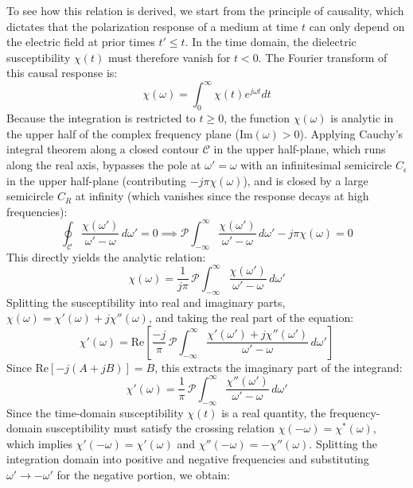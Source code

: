 To see how this relation is derived, we start from the principle of causality, which dictates that the polarization response of a medium at time $t$ can only depend on the electric field at prior times $t' \le t$. In the time domain, the dielectric susceptibility $\chi(t)$ must therefore vanish for $t < 0$. The Fourier transform of this causal response is:
\begin{equation*}
    \chi(\omega) = \int_0^\infty \chi(t) e^{j\omega t} dt
\end{equation*}
Because the integration is restricted to $t \ge 0$, the function $\chi(\omega)$ is analytic in the upper half of the complex frequency plane ($\text{Im}(\omega) > 0$). Applying Cauchy's integral theorem along a closed contour $\mathcal{C}$ in the upper half-plane, which runs along the real axis, bypasses the pole at $\omega' = \omega$ with an infinitesimal semicircle $C_\epsilon$ in the upper half-plane (contributing $-j\pi \chi(\omega)$), and is closed by a large semicircle $C_R$ at infinity (which vanishes since the response decays at high frequencies):
\begin{equation*}
    \oint_{\mathcal{C}} \frac{\chi(\omega')}{\omega' - \omega}\,d\omega' = 0 \implies \mathcal{P}\int_{-\infty}^{\infty} \frac{\chi(\omega')}{\omega' - \omega}\,d\omega' - j\pi \chi(\omega) = 0
\end{equation*}
This directly yields the analytic relation:
\begin{equation*}
    \chi(\omega) = \frac{1}{j\pi}\,\mathcal{P}\int_{-\infty}^{\infty} \frac{\chi(\omega')}{\omega' - \omega}\,d\omega'
\end{equation*}
Splitting the susceptibility into real and imaginary parts, $\chi(\omega) = \chi'(\omega) + j\chi''(\omega)$, and taking the real part of the equation:
\begin{equation*}
    \chi'(\omega) = \text{Re}\left[ \frac{-j}{\pi}\,\mathcal{P}\int_{-\infty}^{\infty} \frac{\chi'(\omega') + j\chi''(\omega')}{\omega' - \omega}\,d\omega' \right]
\end{equation*}
Since $\text{Re}[-j(A + jB)] = B$, this extracts the imaginary part of the integrand:
\begin{equation*}
    \chi'(\omega) = \frac{1}{\pi}\,\mathcal{P}\int_{-\infty}^{\infty} \frac{\chi''(\omega')}{\omega' - \omega}\,d\omega'
\end{equation*}
Since the time-domain susceptibility $\chi(t)$ is a real quantity, the frequency-domain susceptibility must satisfy the crossing relation $\chi(-\omega) = \chi^*(\omega)$, which implies $\chi'(-\omega) = \chi'(\omega)$ and $\chi''(-\omega) = -\chi''(\omega)$. Splitting the integration domain into positive and negative frequencies and substituting $\omega' \to -\omega'$ for the negative portion, we obtain:
